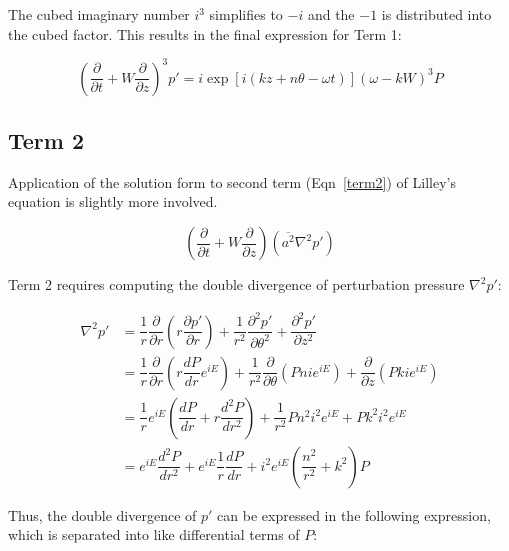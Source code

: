\documentclass[]{aiaa-tc}%
\begin{document}
The cubed imaginary number $i^3$ simplifies to $-i$ and the $-1$ is distributed into the cubed factor.  This results in the final expression for Term 1:

\begin{equation} \label{term1soln}
\boxed{ \left( \dfrac{\partial}{\partial t}
          + W \dfrac{\partial}{\partial z} \right)^3 p'
    =  i\exp[i(kz + n\theta -\omega t)] (\omega - kW)^3 P}
\end{equation}





\clearpage
\subsection{Term 2}

Application of the solution form to second term (Eqn~\ref{term2}) of Lilley's equation is slightly more involved.

\begin{equation}\label{term2}
\left( \dfrac{\partial}{\partial t} + W \dfrac{\partial}{\partial z} \right) (\overline{a^2}\nabla^2p')
\end{equation}

Term 2 requires computing the double divergence of perturbation pressure $\nabla^2 p'$:

\begin{align*}
\nabla^2p'
  &= \dfrac{1}{r}\dfrac{\partial}{\partial r} \left( r\dfrac{\partial p'}{\partial r} \right)
      + \dfrac{1}{r^2} \dfrac{\partial^2 p'}{\partial \theta^2}
      + \dfrac{\partial^2 p'}{\partial z^2} \\
&= \dfrac{1}{r}\dfrac{\partial}{\partial r} \left( r \dfrac{dP}{dr} e^{iE} \right)
      + \dfrac{1}{r^2} \dfrac{\partial }{\partial \theta} \left( Pn ie^{iE} \right)
      + \dfrac{\partial}{\partial z} \left( Pk ie^{iE} \right) \\
&= \dfrac{1}{r} e^{iE} \left(
    \dfrac{dP}{dr} + r \dfrac{d^2P}{dr^2} \right)
      + \dfrac{1}{r^2} Pn^2 i^2 e^{iE}
      + Pk^2 i^2  e^{iE} \\
&= e^{iE} \dfrac{d^2P}{dr^2}
    + e^{iE} \dfrac{1}{r} \dfrac{dP}{dr}
    + i^2 e^{iE} \left( \dfrac{n^2}{r^2} + k^2 \right) P
\end{align*}

Thus, the double divergence of $p'$ can be expressed in the following expression, which is separated into like differential terms of $P$:
\end{document}
